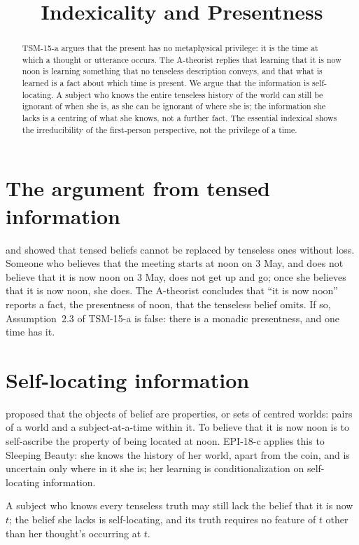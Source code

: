 \documentclass{situationist-preprint}
\title{Indexicality and Presentness}
\begin{document}
\maketitle

\begin{abstract}
TSM-15-a argues that the present has no metaphysical privilege: it is the time at which a thought or utterance occurs. The A-theorist replies that learning that it is now noon is learning something that no tenseless description conveys, and that what is learned is a fact about which time is present. We argue that the information is self-locating. A subject who knows the entire tenseless history of the world can still be ignorant of when she is, as she can be ignorant of where she is; the information she lacks is a centring of what she knows, not a further fact. The essential indexical shows the irreducibility of the first-person perspective, not the privilege of a time.
\end{abstract}

\section{The argument from tensed information}

\citet{Prior1959} and \citet{Perry1979} showed that tensed beliefs cannot be replaced by tenseless ones without loss. Someone who believes that the meeting starts at noon on 3 May, and does not believe that it is now noon on 3 May, does not get up and go; once she believes that it is now noon, she does. The A-theorist concludes that \enquote{it is now noon} reports a fact, the presentness of noon, that the tenseless belief omits. If so, Assumption~2.3 of TSM-15-a is false: there is a monadic presentness, and one time has it.

\section{Self-locating information}

\citet{Lewis1979} proposed that the objects of belief are properties, or sets of centred worlds: pairs of a world and a subject-at-a-time within it. To believe that it is now noon is to self-ascribe the property of being located at noon. EPI-18-c applies this to Sleeping Beauty: she knows the history of her world, apart from the coin, and is uncertain only where in it she is; her learning is conditionalization on self-locating information.

\begin{proposition}\label{p:centre}
A subject who knows every tenseless truth may still lack the belief that it is now $t$; the belief she lacks is self-locating, and its truth requires no feature of $t$ other than her thought's occurring at $t$.
\end{proposition}
\end{document}

